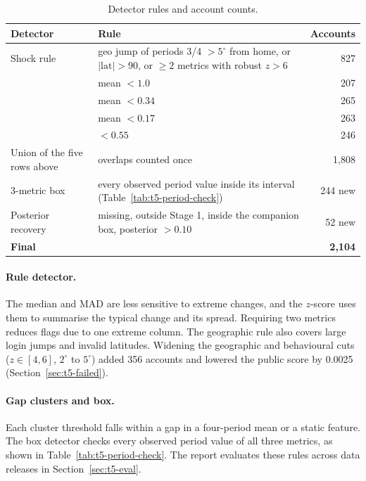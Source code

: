 \documentclass[../main.tex]{subfiles}
\begin{document}
\begin{table}[H]\centering\small
\begin{tabular}{@{}L{.20\linewidth}L{.58\linewidth}r@{}}
\toprule
\textbf{Detector} & \textbf{Rule} & \textbf{Accounts} \\
\midrule
Shock rule & geo jump of periods 3/4 $>5^\circ$ from home, or $|\text{lat}|>90$, or $\ge2$ metrics with robust $z>6$ & 827 \\
 & mean  $<1.0$ & 207 \\
 & mean  $<0.34$ & 265 \\
 & mean  $<0.17$ & 263 \\
 &  $<0.55$ & 246 \\
Union of the five rows above & overlaps counted once & 1,808 \\
3-metric box & every observed period value inside its interval (Table~\ref{tab:t5-period-check}) & 244 new \\
Posterior recovery &  missing, outside Stage 1, inside the companion box, posterior $>0.10$ & 52 new \\
\midrule
\textbf{Final} & & \textbf{2,104} \\
\bottomrule
\end{tabular}
\caption{Detector rules and account counts.}\label{tab:t5-detectors}
\end{table}

\paragraph{Rule detector.} The median and MAD are less sensitive to extreme changes, and the $z$-score uses them to summarise the typical change and its spread. Requiring two metrics reduces flags due to one extreme column. The geographic rule also covers large login jumps and invalid latitudes. Widening the geographic and behavioural cuts ($z\in[4,6]$, $2^\circ$ to $5^\circ$) added 356 accounts and lowered the public score by 0.0025 (Section~\ref{sec:t5-failed}).

\paragraph{Gap clusters and box.} Each cluster threshold falls within a gap in a four-period mean or a static feature. The box detector checks every observed period value of all three metrics, as shown in Table~\ref{tab:t5-period-check}. The report evaluates these rules across data releases in Section~\ref{sec:t5-eval}.
\end{document}
